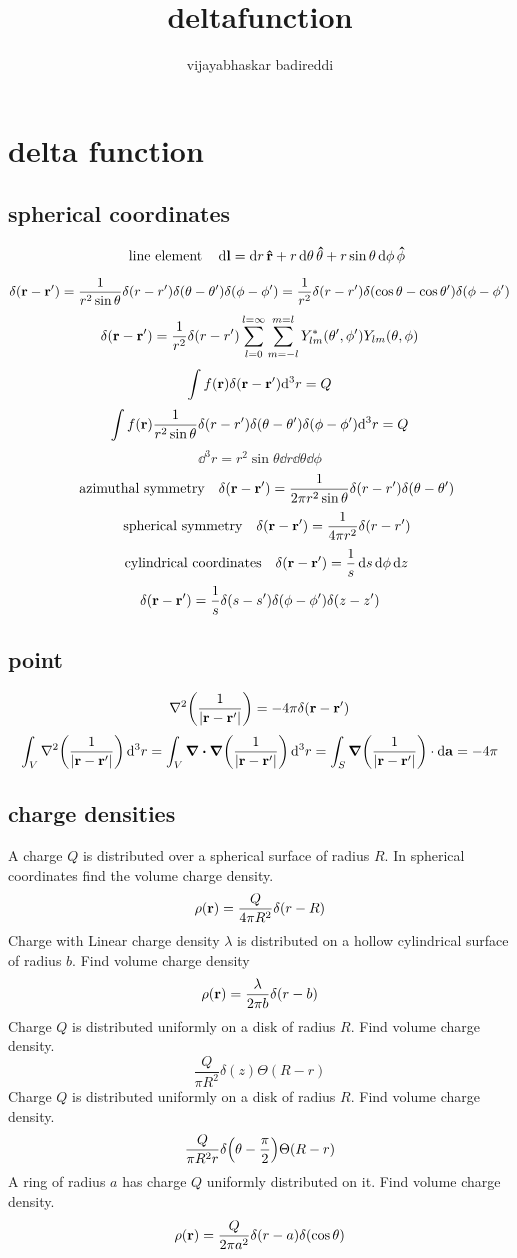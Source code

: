 \documentclass[12pt]{article}
\title{deltafunction}
\author{vijayabhaskar badireddi}
\begin{document}
\section*{delta function}
\subsection*{spherical coordinates}
\[\qq{line element}\dd{\vb{l}}=\dd{r}\vu{r}+r\dd{\theta}\vu{\theta}+r\sin\theta\dd{\phi}\vu{\phi}\]

\[\delta(\vb{r}-\vb{r}')=\frac{1}{r^2\sin\theta}\delta(r-r')\delta(\theta-\theta')\delta(\phi-\phi')=\frac{1}{r^2}\delta(r-r')\delta(\cos\theta-\cos\theta')\delta(\phi-\phi')\]
\[\delta(\vb{r}-\vb{r}')=\frac{1}{r^2}\delta(r-r')\sum_{l=0}^{l=\infty}\sum_{m=-l}^{m=l}Y^*_{lm}(\theta',\phi')Y_{lm}(\theta,\phi)\]
\[\int f(\vb{r})\delta(\vb{r}-\vb{r}')\dd^3{r}=Q\]
\[\int f(\vb{r})\frac{1}{r^2\sin\theta}\delta(r-r')\delta(\theta-\theta')\delta(\phi-\phi')\dd^3{r}=Q\]
\[\dd^3{r}=r^2\sin\theta\dd{r}\dd{\theta}\dd{\phi}\]
\[\qq{azimuthal symmetry} \delta(\vb{r}-\vb{r}')=\frac{1}{2\pi r^2\sin\theta}\delta(r-r')\delta(\theta-\theta')\]
\[\qq{spherical symmetry} \delta(\vb{r}-\vb{r}')=\frac{1}{4\pi r^2}\delta(r-r')\]
\[\qq{cylindrical coordinates}\delta(\vb{r}-\vb{r}')=\frac{1}{s}\dd{s}\dd{\phi}\dd{z}\]
\[\delta(\vb{r}-\vb{r}')=\frac{1}{s}\delta{(s-s')}\delta{(\phi-\phi')}\delta{(z-z')}\]
\subsection*{point }
\[\laplacian\qty(\frac{1}{|\vb{r}-\vb{r}'|})=-4\pi\delta(\vb{r}-\vb{r}')\]
\[\int_V\laplacian\qty(\frac{1}{|\vb{r}-\vb{r}'|})\dd[3]{r}=\int_V\div\grad\qty(\frac{1}{|\vb{r}-\vb{r}'|})\dd[3]{r}=\int_S\grad\qty(\frac{1}{|\vb{r}-\vb{r}'|})\cdot\dd{\vb{a}}=-4\pi\]
\subsection*{charge densities}
A charge $Q$ is distributed over a spherical surface of radius $R$. In spherical coordinates find the volume charge density.
\[\rho(\vb{r})=\frac{Q}{4\pi R^2}\delta(r-R)\] 
Charge with Linear charge density $\lambda$ is distributed on a hollow cylindrical surface of radius $b$. Find volume charge density \[\rho(\vb{r})=\frac{\lambda}{2\pi b}\delta(r-b)\]
Charge $Q$ is distributed uniformly on a disk of radius $R$. Find volume charge density.\[\frac{Q}{\pi R^2}\delta(z)\Theta(R-r)\]
Charge $Q$ is distributed uniformly on a disk of radius $R$. Find volume charge density.\[\frac{Q}{\pi R^2r}\delta\qty(\theta-\frac{\pi}{2})\Theta(R-r)\]
A ring of radius $a$ has charge $Q$ uniformly distributed on it. Find volume charge density.
\[\rho(\vb{r})=\frac{Q}{2\pi a^2}\delta(r-a)\delta(\cos\theta)\]
\end{document}
